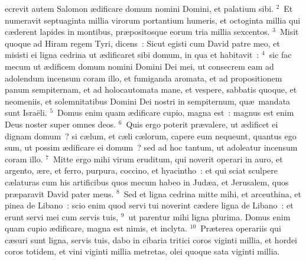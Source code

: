 \bchapter
{}ecrevit autem Salomon \ae dificare domum nomini Domini, et palatium sibi.
${}^{2}$~Et numeravit septuaginta millia virorum portantium humeris, et octoginta millia qui c\ae derent lapides in montibus, pr\ae positosque eorum tria millia sexcentos.
${}^{3}$~Misit quoque ad Hiram regem Tyri, dicens~: Sicut egisti cum David patre meo, et misisti ei ligna cedrina ut \ae dificaret sibi domum, in qua et habitavit~:
${}^{4}$~sic fac mecum ut \ae dificem domum nomini Domini Dei mei, ut consecrem eam ad adolendum incensum coram illo, et fumiganda aromata, et ad propositionem panum sempiternam, et ad holocautomata mane, et vespere, sabbatis quoque, et neomeniis, et solemnitatibus Domini Dei nostri in sempiternum, qu\ae\ mandata sunt Isra\"eli.
${}^{5}$~Domus enim quam \ae dificare cupio, magna est~: magnus est enim Deus noster super omnes deos.
${}^{6}$~Quis ergo poterit pr\ae valere, ut \ae dificet ei dignam domum~? si c\ae lum, et c\ae li c\ae lorum, capere eum nequeunt, quantus ego sum, ut possim \ae dificare ei domum~? sed ad hoc tantum, ut adoleatur incensum coram illo.
${}^{7}$~Mitte ergo mihi virum eruditum, qui noverit operari in auro, et argento, \ae re, et ferro, purpura, coccino, et hyacintho~: et qui sciat sculpere c\ae laturas cum his artificibus quos mecum habeo in Jud\ae a, et Jerusalem, quos pr\ae paravit David pater meus.
${}^{8}$~Sed et ligna cedrina mitte mihi, et arceuthina, et pinea de Libano~: scio enim quod servi tui noverint c\ae dere ligna de Libano~: et erunt servi mei cum servis tuis,
${}^{9}$~ut parentur mihi ligna plurima. Domus enim quam cupio \ae dificare, magna est nimis, et inclyta.
${}^{10}$~Pr\ae terea operariis qui c\ae suri sunt ligna, servis tuis, dabo in cibaria tritici coros viginti millia, et hordei coros totidem, et vini viginti millia metretas, olei quoque sata viginti millia.


